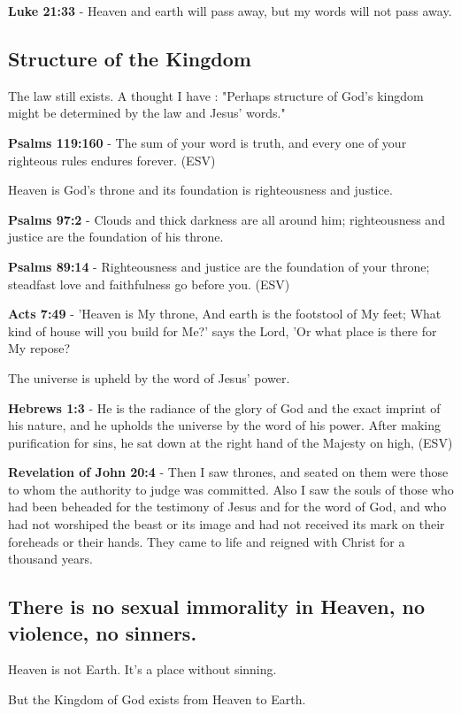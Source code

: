 \documentclass[11pt]{article}
\begin{document}
\textbf{Luke 21:33} - Heaven and earth will pass away, but my words will not pass away.

\subsection{Structure of the Kingdom}
\label{sec:org5f96a93}

The law still exists. A thought I have : "Perhaps structure of God's kingdom might be determined by the law and Jesus' words."

\textbf{Psalms 119:160} - The sum of your word is truth, and every one of your righteous rules endures forever. (ESV)

Heaven is God's throne and its foundation is righteousness and justice.

\textbf{Psalms 97:2} - Clouds and thick darkness are all around him; righteousness and justice are the foundation of his throne.

\textbf{Psalms 89:14} - Righteousness and justice are the foundation of your throne; steadfast love and faithfulness go before you. (ESV)

\textbf{Acts 7:49} - 'Heaven is My throne, And earth is the footstool of My feet; What kind of house will you build for Me?' says the Lord, 'Or what place is there for My repose?

The universe is upheld by the word of Jesus' power.

\textbf{Hebrews 1:3} - He is the radiance of the glory of God and the exact imprint of his nature, and he upholds the universe by the word of his power. After making purification for sins, he sat down at the right hand of the Majesty on high, (ESV)

\textbf{Revelation of John 20:4} - Then I saw thrones, and seated on them were those to whom the authority to judge was committed. Also I saw the souls of those who had been beheaded for the testimony of Jesus and for the word of God, and who had not worshiped the beast or its image and had not received its mark on their foreheads or their hands. They came to life and reigned with Christ for a thousand years.

\subsection{There is no sexual immorality in Heaven, no violence, no sinners.}
\label{sec:org3037a1a}
Heaven is not Earth. It's a place without sinning.

But the Kingdom of God exists from Heaven to Earth.
\end{document}
